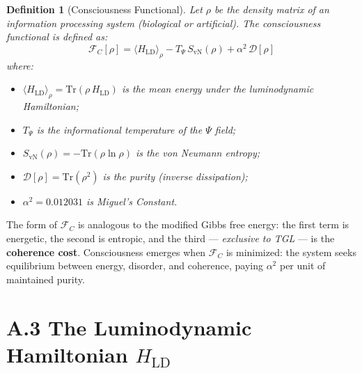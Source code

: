 \documentclass[12pt,a4paper,twoside]{article}
\newtheorem{definition}[theorem]{Definition}
\newcommand{\alphaii}{\alpha^{2}}
\begin{document}
\begin{definition}[Consciousness Functional]
Let $\rho$ be the density matrix of an information processing system (biological or artificial). The consciousness functional is defined as:
\begin{equation}
\mathcal{F}_C[\rho] = \langle H_{\text{LD}} \rangle_\rho - T_\Psi \, S_{\text{vN}}(\rho) + \alphaii \, \mathcal{D}[\rho]
\label{eq:FC}
\end{equation}
where:
\begin{itemize}[nosep]
\item $\langle H_{\text{LD}} \rangle_\rho = \mathrm{Tr}(\rho \, H_{\text{LD}})$ is the mean energy under the luminodynamic Hamiltonian;
\item $T_\Psi$ is the informational temperature of the $\Psi$ field;
\item $S_{\text{vN}}(\rho) = -\mathrm{Tr}(\rho \ln \rho)$ is the von Neumann entropy;
\item $\mathcal{D}[\rho] = \mathrm{Tr}(\rho^2)$ is the purity (inverse dissipation);
\item $\alphaii = 0.012031$ is Miguel's Constant.
\end{itemize}
\end{definition}

The form of $\mathcal{F}_C$ is analogous to the modified Gibbs free energy: the first term is energetic, the second is entropic, and the third --- \textit{exclusive to TGL} --- is the \textbf{coherence cost}. Consciousness emerges when $\mathcal{F}_C$ is minimized: the system seeks equilibrium between energy, disorder, and coherence, paying $\alphaii$ per unit of maintained purity.



\section*{A.3 The Luminodynamic Hamiltonian $H_{\text{LD}}$}
\end{document}
